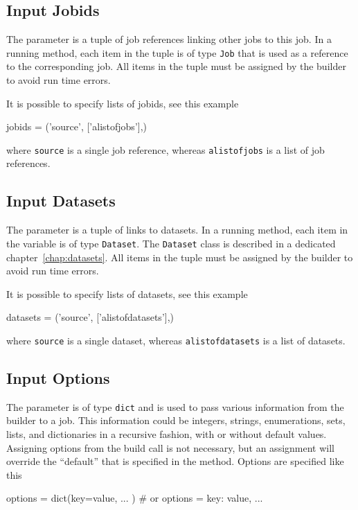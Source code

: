 \subsection*{Input Jobids}
The \jobids parameter is a tuple of job references linking other jobs
to this job.  In a running method, each item in the \jobids tuple is
of type \texttt{Job} that is used as a reference to the corresponding
job.  All items in the \jobids tuple must be assigned by the builder
to avoid run time errors.

It is possible to specify lists of jobids, see this example
\begin{python}
jobids = ('source', ['alistofjobs'],)
\end{python}
where \texttt{source} is a single job reference, whereas
\texttt{alistofjobs} is a list of job references.


\subsection*{Input Datasets}
The \datasets parameter is a tuple of links to datasets.  In a running
method, each item in the \datasets variable is of type
\texttt{Dataset}.  The \texttt{Dataset} class is described in a
dedicated chapter~\ref{chap:datasets}.  All items in the \datasets
tuple must be assigned by the builder to avoid run time errors.

It is possible to specify lists of datasets, see this example
\begin{python}
datasets = ('source', ['alistofdatasets'],)
\end{python}
where \texttt{source} is a single dataset, whereas
\texttt{alistofdatasets} is a list of datasets.




\subsection*{Input Options}

The \options parameter is of type \texttt{dict} and is used to pass
various information from the builder to a job.  This information could
be integers, strings, enumerations, sets, lists, and dictionaries in a
recursive fashion, with or without default values.  Assigning options
from the build call is not necessary, but an assignment will override
the ``default'' that is specified in the method.  Options are
specified like this
\begin{python}
  options = dict(key=value, ... )  # or
  options = {key: value, ...}
\end{python}

